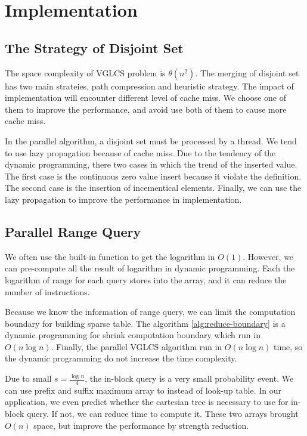 \section{Implementation}
\label{sec:Implementation}

\subsection{The Strategy of Disjoint Set}

The space complexity of VGLCS problem is $\theta(n^2)$.  The merging
of disjoint set has two main strateies, path compression and heuristic
strategy.  The impact of implementation will encounter different level
of cache miss.  We choose one of them to improve the performance, and
avoid use both of them to cause more cache miss.


In the parallel algorithm, a disjoint set must be processed by a
thread.  We tend to use lazy propagation because of cache miss.  Due
to the tendency of the dynamic programming, there two cases in which
the trend of the inserted value.  The first case is the continuous
zero value insert because it violate the definition.  The second case
is the insertion of incementical elements.  Finally, we can use the
lazy propagation to improve the performance in implementation.

\subsection{Parallel Range Query}

We often use the built-in function to get the logarithm in $O(1)$.
However, we can pre-compute all the result of logarithm in dynamic
programming.  Each the logarithm of range for each query stores into
the array, and it can reduce the number of instructions.

Because we know the information of range query, we can limit the
computation boundary for building sparse table.  The algorithm
\ref{alg:reduce-boundary} is a dynamic programming for shrink
computation boundary which run in $O(n \log n)$.  Finally, the
parallel VGLCS algorithm run in $O(n \log n)$ time, so the dynamic
programming do not increase the time complexity.



Due to small $s = \frac{\log n}{4}$, the in-block query is a very
small probability event.  We can use prefix and suffix maximum array
to instead of look-up table.  In our application, we even predict
whether the cartesian tree is necessary to use for in-block query.  If
not, we can  reduce time to compute it.  These two arrays brought
$O(n)$ space, but improve the performance by strength reduction.
